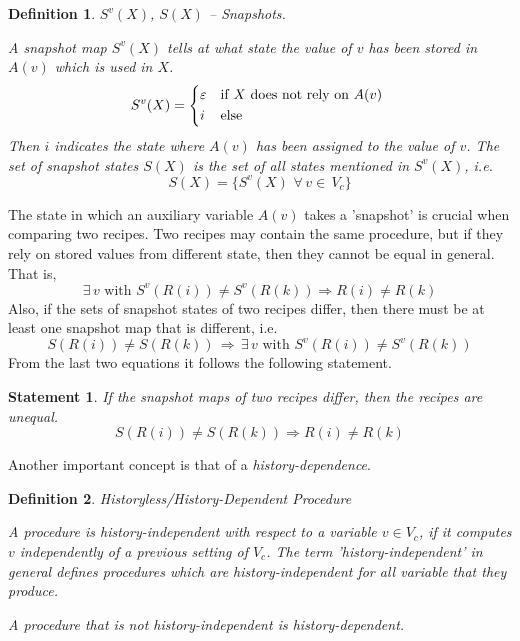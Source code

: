 \documentclass[12pt,a4paper]{scrartcl}
\newtheorem{definition}{Definition}
\newtheorem{statement}{Statement}
\begin{document}
\begin{definition} $S^v(X)$, $S(X)$ -- Snapshots.

    A \textit{snapshot map} $S^v(X)$ tells at what state the value of $v$ has
    been stored in $A(v)$ which is used in $X$. 
    \begin{equation}
        S^v(X) = \begin{dcases*}
                   \varepsilon & if $X$ does not rely on $A(v)$ \\
                   i           & else
                 \end{dcases*}
    \end{equation}
    Then $i$ indicates the state where $A(v)$ has been assigned to the value of $v$.
    The \textit{set of snapshot states} $S(X)$ is the set of all states mentioned in
    $S^v(X)$, i.e.
    \begin{equation}
        \label{eq:snapshot-map-1}
        S(X) = \{ S^v(X) \,\,\forall\,v\in\,V_c\}
    \end{equation}

\end{definition}
The state in which an auxiliary variable $A(v)$ takes a 'snapshot' is crucial when
comparing two recipes. Two recipes may contain the same procedure, but if they rely on
stored values from different state, then they cannot be equal in general. That is, 
\begin{equation} \label{eq:snapshot-map-difference}
   \exists\,v\,\,\mbox{with}\,\,S^v(R(i)) \neq S^v(R(k)) \Rightarrow R(i) \neq R(k)
\end{equation}
Also, if the sets of snapshot states of two recipes differ, then there must be 
at least one snapshot map that is different, i.e.
\begin{equation} \label{eq:snapshot-map-difference-2b}
   S(R(i)) \neq S(R(k)) \,\Rightarrow\,\exists\,v\,\,\mbox{with}\,\,S^v(R(i)) \neq S^v(R(k)) 
\end{equation}
From the last two equations it follows the following statement.
\begin{statement}
   If the snapshot maps of two recipes differ, then the recipes are unequal. 
   \begin{equation} \label{eq:snapshot-map-difference3}
       S(R(i)) \neq S(R(k)) \Rightarrow R(i) \neq R(k)
   \end{equation}
\end{statement}
Another important concept is that of a \textit{history-dependence}.
\begin{definition} Historyless/History-Dependent Procedure

    A procedure is history-independent with respect to a variable $v\in V_c$,
    if it computes $v$ independently of a previous setting of $V_c$. The
    term 'history-independent' in general defines procedures which are 
    history-independent for all variable that they produce.
    
    A procedure that is not history-independent is history-dependent.

\end{definition}
\end{document}
